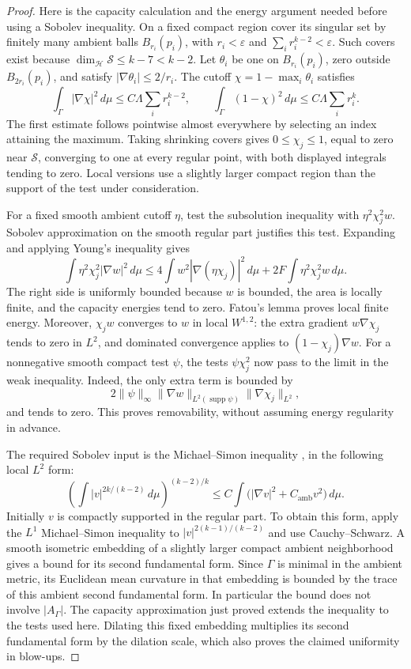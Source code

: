 \begin{proof}
Here is the capacity calculation and the energy argument needed before
using a Sobolev inequality.  On a fixed compact region cover its
singular set by finitely many ambient balls $B_{r_i}(p_i)$, with
$r_i<\varepsilon$ and $\sum_i r_i^{k-2}<\varepsilon$.
Such covers exist because
$\dim_{\mathcal H}\mathcal S\leq k-7<k-2$.
Let $\theta_i$ be one on $B_{r_i}(p_i)$, zero outside $B_{2r_i}(p_i)$,
and satisfy $|\nabla\theta_i|\leq2/r_i$.
The cutoff $\chi=1-\max_i\theta_i$ satisfies
\[
 \int_\Gamma|\nabla\chi|^2\,d\mu
 \leq C\Lambda\sum_i r_i^{k-2},\qquad
 \int_\Gamma(1-\chi)^2\,d\mu
 \leq C\Lambda\sum_i r_i^k.
\]
The first estimate follows pointwise almost everywhere by selecting an
index attaining the maximum.  Taking shrinking covers gives
$0\leq\chi_j\leq1$, equal to zero near $\mathcal S$, converging to one
at every regular point, with both displayed integrals tending to zero.
Local versions use a slightly larger compact region than the support
of the test under consideration.

For a fixed smooth ambient cutoff $\eta$, test the subsolution
inequality with $\eta^2\chi_j^2w$.  Sobolev approximation on the smooth
regular part justifies this test.  Expanding and applying Young's
inequality gives
\[
 \int \eta^2\chi_j^2|\nabla w|^2\,d\mu
 \leq 4\int w^2|\nabla(\eta\chi_j)|^2\,d\mu
      +2F\int\eta^2\chi_j^2w\,d\mu.
\]
The right side is uniformly bounded because $w$ is bounded, the area
is locally finite, and the capacity energies tend to zero.  Fatou's
lemma proves local finite energy.  Moreover, $\chi_jw$ converges to
$w$ in local $W^{1,2}$: the extra gradient $w\nabla\chi_j$ tends to
zero in $L^2$, and dominated convergence applies to
$(1-\chi_j)\nabla w$.
For a nonnegative smooth compact test $\psi$, the tests
$\psi\chi_j^2$ now pass to the limit in the weak inequality.  Indeed,
the only extra term is bounded by
\[
 2\|\psi\|_\infty
 \|\nabla w\|_{L^2(\operatorname{supp}\psi)}
 \|\nabla\chi_j\|_{L^2},
\]
and tends to zero.  This proves removability, without assuming energy
regularity in advance.

The required Sobolev input is the Michael--Simon inequality
\cite{MichaelSimon1973}, in the following local $L^2$ form:
\[
 \left(\int|v|^{2k/(k-2)}\,d\mu\right)^{(k-2)/k}
 \leq C\int\bigl(|\nabla v|^2+C_{\mathrm{amb}}v^2\bigr)\,d\mu.
\]
Initially $v$ is compactly supported in the regular part.  To obtain
this form, apply the $L^1$ Michael--Simon inequality to
$|v|^{2(k-1)/(k-2)}$ and use Cauchy--Schwarz.  A smooth isometric
embedding of a slightly larger compact ambient neighborhood gives a
bound for its second fundamental form.  Since $\Gamma$ is minimal
in the ambient metric, its Euclidean mean curvature in that embedding
is bounded by the trace of this ambient second fundamental form.
In particular the bound does not involve $|A_\Gamma|$.
The capacity approximation just proved extends the inequality to the
tests used here.  Dilating this fixed embedding multiplies its
second fundamental form by the dilation scale, which also proves the
claimed uniformity in blow-ups.


\end{proof}
